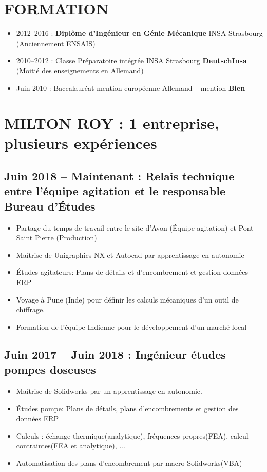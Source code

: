 \documentclass[10pt,a4paper,sans]{article}
\begin{document}
\begin{minipage}[t]{0.68\textwidth}
    \vspace{0.15cm}
    \section{FORMATION}
        \begin{itemize}
            \item{2012--2016 : \textbf{Diplôme d'Ingénieur en Génie Mécanique} INSA Strasbourg (Anciennement ENSAIS)}
            \item{2010--2012 : Classe Préparatoire intégrée INSA Strasbourg \textbf{DeutschInsa} \newline (Moitié des enseignements en Allemand)}
            \item{Juin 2010 : Baccalauréat mention européenne Allemand -- mention \textbf{Bien}}
        \end{itemize}

    \section{MILTON ROY : 1 entreprise, plusieurs expériences}
    \subsection{Juin 2018 -- Maintenant : Relais technique entre l'équipe agitation et le responsable Bureau d'Études}
    \begin{itemize}%
        \item{Partage du temps de travail entre le site d’Avon (Équipe agitation) et Pont Saint Pierre (Production)}
        \item{Maîtrise de Unigraphics NX et Autocad par apprentissage en autonomie}
        \item{Études agitateurs: Plans de détails et d'encombrement et gestion données ERP }
        \item{Voyage à Pune (Inde) pour définir les calculs mécaniques d'un outil de chiffrage.} 
        \item{Formation de l’équipe Indienne pour le développement d’un marché local}
    \end{itemize}

    \subsection{Juin 2017 -- Juin 2018 : Ingénieur études pompes doseuses}
    \begin{itemize}
        \item{Maîtrise de Solidworks par un apprentissage en autonomie.}
        \item{Études pompe: Plans de détails, plans d’encombrements et gestion des données ERP}
        \item{Calculs : échange thermique(analytique), fréquences propres(FEA), calcul contraintes(FEA et analytique), ...}
        \item{Automatisation des plans d’encombrement par macro Solidworks(VBA)}
    \end{itemize}


\end{minipage}
\end{document}
